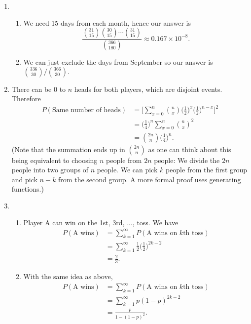 \documentclass{article}
\begin{document}
\begin{enumerate}
    \item \begin{enumerate}
        \item We need 15 days from each month, hence our answer is 
        \[ \frac{\binom{31}{15}\binom{30}{15}\cdots\binom{31}{15}}{\binom{366}{180}} 
        \approx 0.167 \times 10^{-8}. \]

        \item We can just exclude the days from September so our answer is 
        $\binom{336}{30} / \binom{366}{30}.$
    \end{enumerate}

    \item There can be 0 to $n$ heads for both players, which are disjoint events. Therefore 
    \begin{align*}
        P(\text{Same number of heads}) 
        &= \Big[ \sum_{x = 0}^{n} \binom{n}{x} \Big(\frac{1}{2} \Big)^{x} 
        \Big(\frac{1}{2} \Big)^{n - x}\Big]^2 \\
        &= \Big( \frac{1}{4} \Big)^{n} \sum_{x = 0}^{n} \binom{n}{x}^{2} \\
        &= \binom{2n}{n} \Big( \frac{1}{4} \Big)^{n}.
    \end{align*}
    (Note that the summation ends up in $\binom{2n}{n}$ as one can think about this being 
    equivalent to choosing $n$ people from $2n$ people: We divide the $2n$ people into two 
    groups of $n$ people. We can pick $k$ people from the first group and pick $n - k$ from 
    the second group. A more formal proof uses generating functions.)

    \item \begin{enumerate}
        \item Player A can win on the 1st, 3rd, ..., toss. We have 
        \begin{align*}
            P(\text{A wins}) 
            &= \sum_{k = 1}^{\infty} P(\text{A wins on } k \text{th toss}) \\
            &= \sum_{k = 1}^{\infty} \frac{1}{2} \Big( \frac{1}{2} \Big)^{2k - 2} \\
            &= \frac{2}{3}.
        \end{align*}

        \item With the same idea as above, 
        \begin{align*}
            P(\text{A wins}) 
            &= \sum_{k = 1}^{\infty} P(\text{A wins on } k \text{th toss}) \\
            &= \sum_{k = 1}^{\infty} p (1 - p)^{2k - 2} \\
            &= \frac{p}{1 - (1-p)^2}.
        \end{align*}


\end{enumerate}
\end{enumerate}
\end{document}
